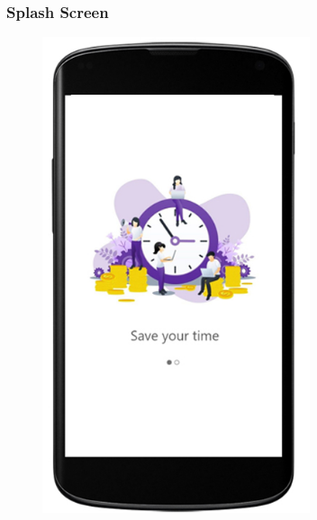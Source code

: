 \subsubsection{Splash Screen}
\begin{figure}[H]
  \centering
  \includegraphics[width=0.7\textwidth,keepaspectratio]{images/3.jpg}
\end{figure}

